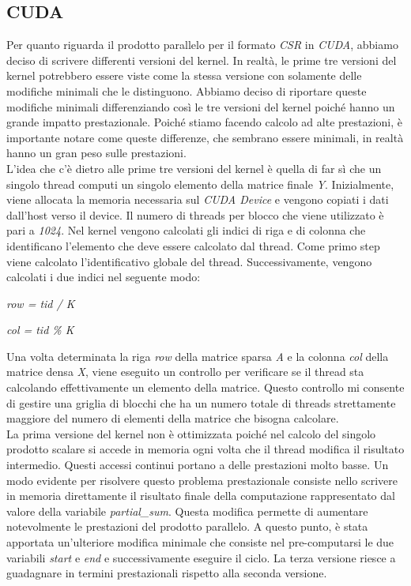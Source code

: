 \documentclass{article}
\begin{document}
\subsection{CUDA}
Per quanto riguarda il prodotto parallelo per il formato \textit{CSR} in \textit{CUDA}, abbiamo deciso di scrivere differenti versioni del kernel. In realtà, le prime tre versioni del kernel potrebbero essere viste come la stessa versione con solamente delle modifiche minimali che le distinguono. Abbiamo deciso di riportare queste modifiche minimali differenziando così le tre versioni del kernel poiché hanno un grande impatto prestazionale. Poiché stiamo facendo calcolo ad alte prestazioni, è importante notare come queste differenze, che sembrano essere minimali, in realtà hanno un gran peso sulle prestazioni.\\
L'idea che c'è dietro alle prime tre versioni del kernel è quella di far sì che un singolo thread computi un singolo elemento della matrice finale \textit{Y}. Inizialmente, viene allocata la memoria necessaria sul \textit{CUDA Device} e vengono copiati i dati dall'host verso il device. Il numero di threads per blocco che viene utilizzato è pari a \textit{1024}. Nel kernel vengono calcolati gli indici di riga e di colonna che identificano l'elemento che deve essere calcolato dal thread. Come primo step viene calcolato l'identificativo globale del thread. Successivamente, vengono calcolati i due indici nel seguente modo:

\begin{center}
\item \textit{row = tid / K}
\item \textit{col = tid \% K}
\end{center}

Una volta determinata la riga \textit{row} della matrice sparsa \textit{A} e la colonna \textit{col} della matrice densa \textit{X}, viene eseguito un controllo per verificare se il thread sta calcolando effettivamente un elemento della matrice. Questo controllo mi consente di gestire una griglia di blocchi che ha un numero totale di threads strettamente maggiore del numero di elementi della matrice che bisogna calcolare.\\
La prima versione del kernel non è ottimizzata poiché nel calcolo del singolo prodotto scalare si accede in memoria ogni volta che il thread modifica il risultato intermedio. Questi accessi continui portano a delle prestazioni molto basse. Un modo evidente per risolvere questo problema prestazionale consiste nello scrivere in memoria direttamente il risultato finale della computazione rappresentato dal valore della variabile \textit{partial\_sum}. Questa modifica permette di aumentare notevolmente le prestazioni del prodotto parallelo. A questo punto, è stata apportata un'ulteriore modifica minimale che consiste nel pre-computarsi le due variabili \textit{start} e \textit{end} e successivamente eseguire il ciclo. La terza versione riesce a guadagnare in termini prestazionali rispetto alla seconda versione.\\
\end{document}
